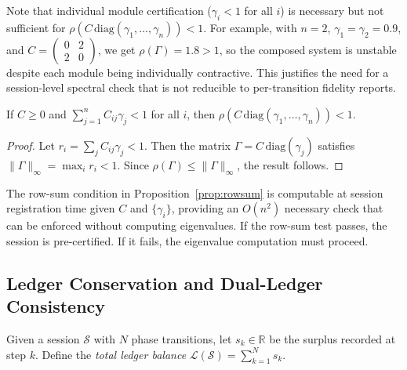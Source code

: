 \documentclass[11pt]{article}
\begin{document}
\begin{remark}
Note that individual module certification ($\gamma_{i}<1$ for all $i$)
is necessary but not sufficient for
$\rho(C\,\mathrm{diag}(\gamma_{1},\dots,\gamma_{n}))<1$.
For example, with $n=2$, $\gamma_{1}=\gamma_{2}=0.9$, and
$C=\begin{pmatrix}0&2\\2&0\end{pmatrix}$,
we get $\rho(\Gamma)=1.8>1$, so the composed system is unstable
despite each module being individually contractive.
This justifies the need for a session-level spectral check that is
not reducible to per-transition fidelity reports.
\end{remark}

\begin{proposition}
\label{prop:rowsum}
If $C\geq 0$ and
$\sum_{j=1}^{n}C_{ij}\gamma_{j}<1$ for all $i$,
then $\rho(C\,\mathrm{diag}(\gamma_{1},\dots,\gamma_{n}))<1$.
\end{proposition}

\begin{proof}
Let $r_{i}=\sum_{j}C_{ij}\gamma_{j}<1$.
Then the matrix $\Gamma=C\,\mathrm{diag}(\gamma_{j})$
satisfies $\|\Gamma\|_{\infty}=\max_{i}r_{i}<1$.
Since $\rho(\Gamma)\leq\|\Gamma\|_{\infty}$, the result follows.
\end{proof}

\begin{corollary}
\label{cor:runtimecheck}
The row-sum condition in Proposition~\ref{prop:rowsum}
is computable at session registration time given $C$ and $\{\gamma_{i}\}$,
providing an $O(n^{2})$ necessary check that can be enforced
without computing eigenvalues.
If the row-sum test passes, the session is pre-certified.
If it fails, the eigenvalue computation must proceed.
\end{corollary}

\subsection{Ledger Conservation and Dual-Ledger Consistency}
\label{sec:ledger}

\begin{definition}
\label{def:ledger}
Given a session $\mathcal{S}$ with $N$ phase transitions,
let $s_{k}\in\mathbb{R}$ be the surplus recorded at step $k$.
Define the \emph{total ledger balance}
$\mathcal{L}(\mathcal{S}) = \sum_{k=1}^{N}s_{k}$.
\end{definition}
\end{document}
